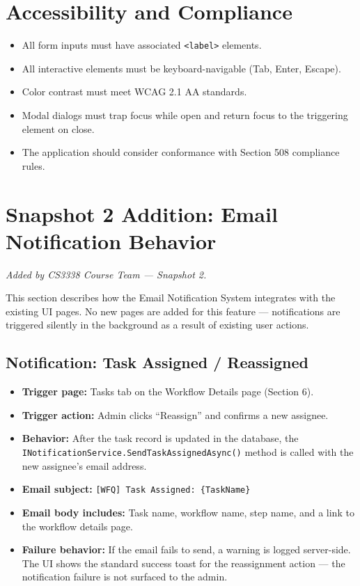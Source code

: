 \documentclass[12pt]{article}
\begin{document}
\section{Accessibility and Compliance}

\begin{itemize}
    \item All form inputs must have associated \texttt{<label>} elements.
    \item All interactive elements must be keyboard-navigable (Tab, Enter, Escape).
    \item Color contrast must meet WCAG 2.1 AA standards.
    \item Modal dialogs must trap focus while open and return focus to the triggering element
    on close.
    \item The application should consider conformance with Section 508 compliance rules.
\end{itemize}

\section{Snapshot 2 Addition: Email Notification Behavior}
\textit{Added by CS3338 Course Team --- Snapshot 2.}

This section describes how the Email Notification System integrates with the existing UI
pages. No new pages are added for this feature --- notifications are triggered silently in
the background as a result of existing user actions.

\subsection{Notification: Task Assigned / Reassigned}
\begin{itemize}
    \item \textbf{Trigger page:} Tasks tab on the Workflow Details page (Section 6).
    \item \textbf{Trigger action:} Admin clicks ``Reassign'' and confirms a new assignee.
    \item \textbf{Behavior:} After the task record is updated in the database, the
    \texttt{INotificationService.SendTaskAssignedAsync()} method is called with the new
    assignee's email address.
    \item \textbf{Email subject:} \texttt{[WFQ] Task Assigned: \{TaskName\}}
    \item \textbf{Email body includes:} Task name, workflow name, step name, and a link to
    the workflow details page.
    \item \textbf{Failure behavior:} If the email fails to send, a warning is logged
    server-side. The UI shows the standard success toast for the reassignment action --- the
    notification failure is not surfaced to the admin.
\end{itemize}
\end{document}
